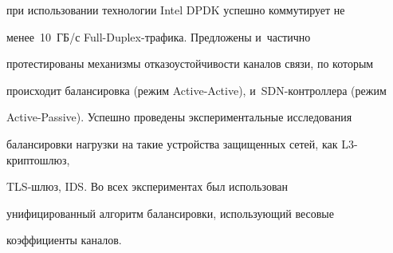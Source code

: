 при использовании технологии Intel DPDK успешно коммутирует не 


менее~10~ГБ\!/\!с Full-Duplex-тра\-фи\-ка. Предложены и~частично 


протестированы механизмы от\-ка\-зо\-устой\-чи\-вости каналов связи, по которым 


происходит балансировка (режим Active-Active), и~SDN-конт\-рол\-лера (режим 


Active-Passive). Успешно проведены экспериментальные исследования 


балансировки нагрузки на такие устройства защищенных сетей, как L3-крип\-то\-шлюз, 


TLS-шлюз, IDS. Во всех экспериментах был использован 


унифицированный алгоритм балансировки, использующий весовые 


коэффициенты каналов.


  


